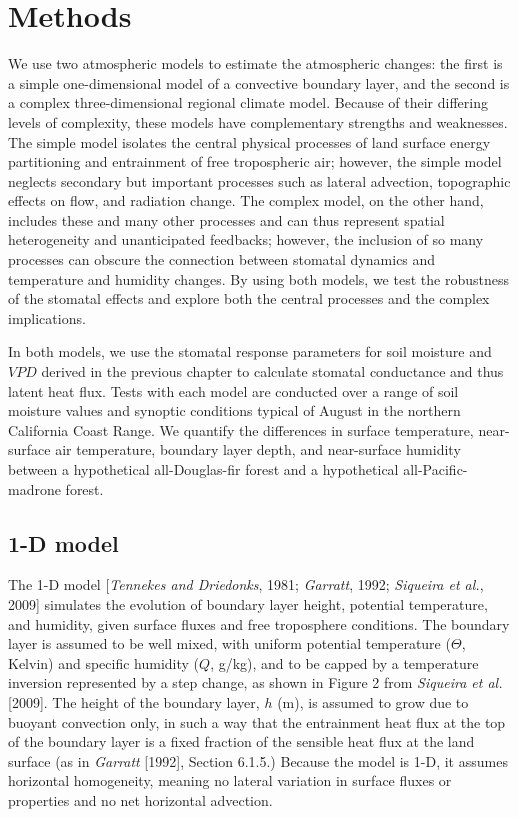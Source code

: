 \linespread{1.6}\selectfont

\section{Methods}

We use two atmospheric models to estimate the atmospheric changes: the first is a simple one-dimensional model of a convective boundary layer, and the second is a complex three-dimensional regional climate model.  Because of their differing levels of complexity, these models have complementary strengths and weaknesses.  The simple model isolates the central physical processes of land surface energy partitioning and entrainment of free tropospheric air; however, the simple model neglects secondary but important processes such as lateral advection, topographic effects on flow, and radiation change.  The complex model, on the other hand, includes these and many other processes and can thus represent spatial heterogeneity and unanticipated feedbacks; however, the inclusion of so many processes can obscure the connection between stomatal dynamics and temperature and humidity changes.  By using both models, we test the robustness of the stomatal effects and explore both the central processes and the complex implications.

In both models, we use the stomatal response parameters for soil moisture and $VPD$ derived in the previous chapter to calculate stomatal conductance and thus latent heat flux.  Tests with each model are conducted over a range of soil moisture values and synoptic conditions typical of August in the northern California Coast Range.  We quantify the differences in surface temperature, near-surface air temperature, boundary layer depth, and near-surface humidity between a hypothetical all-Douglas-fir forest and a hypothetical all-Pacific-madrone forest.

\subsection{1-D model}
The 1-D model [\textit{Tennekes and Driedonks}, 1981; \textit{Garratt}, 1992; \textit{Siqueira et al.}, 2009] simulates the evolution of boundary layer height, potential temperature, and humidity, given surface fluxes and free troposphere conditions.  The boundary layer is assumed to be well mixed, with uniform potential temperature ($\Theta$, Kelvin) and specific humidity ($Q$, g/kg), and to be capped by a temperature inversion represented by a step change, as shown in Figure 2 from \textit{Siqueira et al.} [2009].  The height of the boundary layer, $h$ (m), is assumed to grow due to buoyant convection only, in such a way that the entrainment heat flux at the top of the boundary layer is a fixed fraction of the sensible heat flux at the land surface (as in \textit{Garratt} [1992], Section 6.1.5.)  Because the model is 1-D, it assumes horizontal homogeneity, meaning no lateral variation in surface fluxes or properties and no net horizontal advection.

